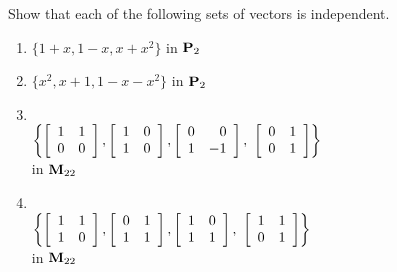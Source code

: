\begin{multicols}{2}
\begin{ex}
Show that each of the following sets of vectors is independent.

\begin{enumerate}[label={\alph*.}]
\item $\{1 + x, 1 - x, x + x^{2}\}$ in $\textbf{P}_{2}$

\item $\{x^{2}, x + 1, 1 - x - x^{2}\}$ in $\textbf{P}_{2}$

\item \hspace{1em} \\
\hspace*{-2em}$
\left\{
\left[ \begin{array}{rr}
1 & 1 \\
0 & 0
\end{array} \right]
, 
\left[ \begin{array}{rr}
1 & 0 \\
1 & 0
\end{array} \right]
, 
\left[ \begin{array}{rr}
0 & 0 \\
1 & -1
\end{array} \right]
,\
\left[ \begin{array}{rr}
0 & 1 \\
0 & 1
\end{array} \right]
\right\}$ \\  in $\textbf{M}_{22}$

\item \hspace{1em} \\
\hspace*{-2em}$
\left\{
\left[ \begin{array}{rr}
1 & 1 \\
1 & 0
\end{array} \right]
, 
\left[ \begin{array}{rr}
0 & 1 \\
1 & 1
\end{array} \right]
, 
\left[ \begin{array}{rr}
1 & 0 \\
1 & 1
\end{array} \right]
,\
\left[ \begin{array}{rr}
1 & 1 \\
0 & 1
\end{array} \right]
\right\}$ \\ in $\textbf{M}_{22}$


\end{enumerate}
\end{ex}
\end{multicols}
